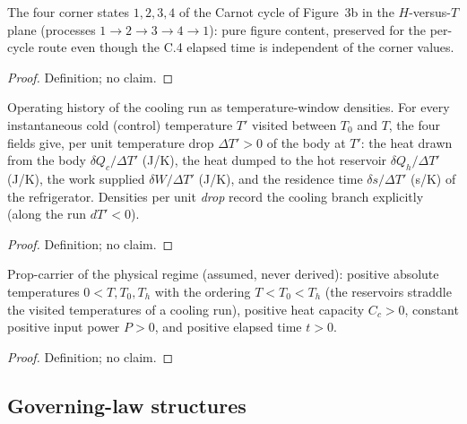 \begin{definition}
\label{def:IPhO2026Problems_problem_IPhO_2026_3_C_4:CycleCorners}
The four corner states $1, 2, 3, 4$ of the Carnot cycle of Figure~3b in
the $H$-versus-$T$ plane (processes $1 \to 2 \to 3 \to 4 \to 1$): pure
figure content, preserved for the per-cycle route even though the C.4
elapsed time is independent of the corner values.
\end{definition}
\begin{proof}
Definition; no claim.
\end{proof}

\begin{definition}
\label{def:IPhO2026Problems_problem_IPhO_2026_3_C_4:CoolingRun}
Operating history of the cooling run as temperature-window densities.
For every instantaneous cold (control) temperature $T'$ visited
between $T_0$ and $T$, the four fields give, per unit temperature drop
$\Delta T' > 0$ of the body at $T'$: the heat drawn from the body
$\delta Q_c / \Delta T'$ (J/K), the heat dumped to the hot reservoir
$\delta Q_h / \Delta T'$ (J/K), the work supplied $\delta W / \Delta T'$
(J/K), and the residence time $\delta s / \Delta T'$ (s/K) of the
refrigerator. Densities per unit \emph{drop} record the cooling branch
explicitly (along the run $dT' < 0$).
\end{definition}
\begin{proof}
Definition; no claim.
\end{proof}

\begin{definition}
\label{def:IPhO2026Problems_problem_IPhO_2026_3_C_4:RegimeAssumptions}
Prop-carrier of the physical regime (assumed, never derived): positive
absolute temperatures $0 < T, T_0, T_h$ with the ordering
$T < T_0 < T_h$ (the reservoirs straddle the visited temperatures of a
cooling run), positive heat capacity $C_c > 0$, constant positive
input power $P > 0$, and positive elapsed time $t > 0$.
\end{definition}
\begin{proof}
Definition; no claim.
\end{proof}

\subsection*{Governing-law structures}

